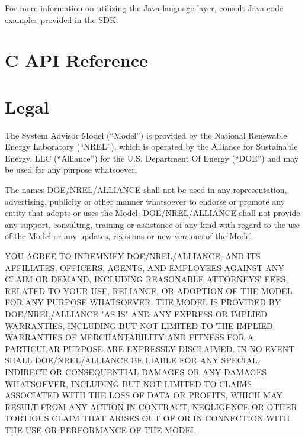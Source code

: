\documentclass{scrartcl} %
\begin{document}
For more information on utilizing the Java language layer, consult Java code examples provided in the SDK.  


\section{C API Reference}
\label{sec_api_ref}


\section{Legal}

The System Advisor Model (``Model'') is provided by the National Renewable Energy Laboratory (``NREL''), which is operated by the Alliance for Sustainable Energy, LLC (``Alliance'') for the U.S. Department Of Energy (``DOE'') and may be used for any purpose whatsoever.  

The names DOE/NREL/ALLIANCE shall not be used in any representation, advertising, publicity or other manner whatsoever to endorse or promote any entity that adopts or uses the Model.  DOE/NREL/ALLIANCE shall not provide any support, consulting, training or assistance of any kind with regard to the use of the Model or any updates, revisions or new versions of the Model.

YOU AGREE TO INDEMNIFY DOE/NREL/ALLIANCE, AND ITS AFFILIATES, OFFICERS, AGENTS, AND EMPLOYEES AGAINST ANY CLAIM OR DEMAND, INCLUDING REASONABLE ATTORNEYS' FEES, RELATED TO YOUR USE, RELIANCE, OR ADOPTION OF THE MODEL FOR ANY PURPOSE WHATSOEVER.  THE MODEL IS PROVIDED BY DOE/NREL/ALLIANCE "AS IS" AND ANY EXPRESS OR IMPLIED WARRANTIES, INCLUDING BUT NOT LIMITED TO THE IMPLIED WARRANTIES OF MERCHANTABILITY AND FITNESS FOR A PARTICULAR PURPOSE ARE EXPRESSLY DISCLAIMED.  IN NO EVENT SHALL DOE/NREL/ALLIANCE BE LIABLE FOR ANY SPECIAL, INDIRECT OR CONSEQUENTIAL DAMAGES OR ANY DAMAGES WHATSOEVER, INCLUDING BUT NOT LIMITED TO CLAIMS ASSOCIATED WITH THE LOSS OF DATA OR PROFITS, WHICH MAY RESULT FROM ANY ACTION IN CONTRACT, NEGLIGENCE OR OTHER TORTIOUS CLAIM THAT ARISES OUT OF OR IN CONNECTION WITH THE USE OR PERFORMANCE OF THE MODEL.
\end{document}
